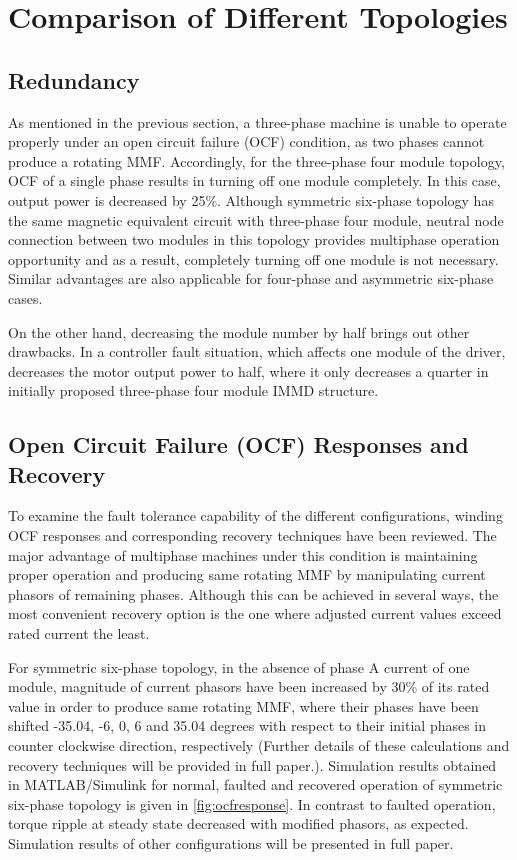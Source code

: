 \documentclass[a4paper,11pt]{article}
\begin{document}
\section{\normalsize\textbf{Comparison of Different Topologies}}
\subsection{\normalsize\textbf{Redundancy}}
As mentioned in the previous section, a three-phase machine is unable to operate properly under an open circuit failure (OCF) condition, as two phases cannot produce a rotating MMF. Accordingly, for the three-phase four module topology, OCF of a single phase results in turning off one module completely. In this case, output power is decreased by 25\%. Although symmetric six-phase topology has the same magnetic equivalent circuit with three-phase four module, neutral node connection between two modules in this topology provides multiphase operation opportunity and as a result, completely turning off one module is not necessary. Similar advantages are also applicable for four-phase and asymmetric six-phase cases. \par
On the other hand, decreasing the module number by half brings out other drawbacks. In a controller fault situation, which affects one module of the driver, decreases the motor output power to half, where it only decreases a quarter in initially proposed three-phase four module IMMD structure.

\subsection{\normalsize\textbf{Open Circuit Failure (OCF) Responses and Recovery}}

To examine the fault tolerance capability of the different configurations, winding OCF responses and corresponding recovery techniques have been reviewed. The major advantage of multiphase machines under this condition is maintaining proper operation and producing same rotating MMF by manipulating current phasors of remaining phases. Although this can be achieved in several ways, the most convenient recovery option is the one where adjusted current values exceed rated current the least.\par
For symmetric six-phase topology, in the absence of phase A current of one module, magnitude of current phasors have been increased by 30\% of its rated value in order to produce same rotating MMF, where their phases have been shifted -35.04, -6, 0, 6 and 35.04 degrees with respect to their initial phases in counter clockwise direction, respectively \cite{recover} (Further details of these calculations and recovery techniques will be provided in full paper.). Simulation results obtained in MATLAB/Simulink for normal, faulted and recovered operation of symmetric six-phase topology is given in \ref{fig:ocfresponse}. In contrast to faulted operation, torque ripple at steady state decreased with modified phasors, as expected. Simulation results of other configurations will be presented in full paper.
\end{document}
